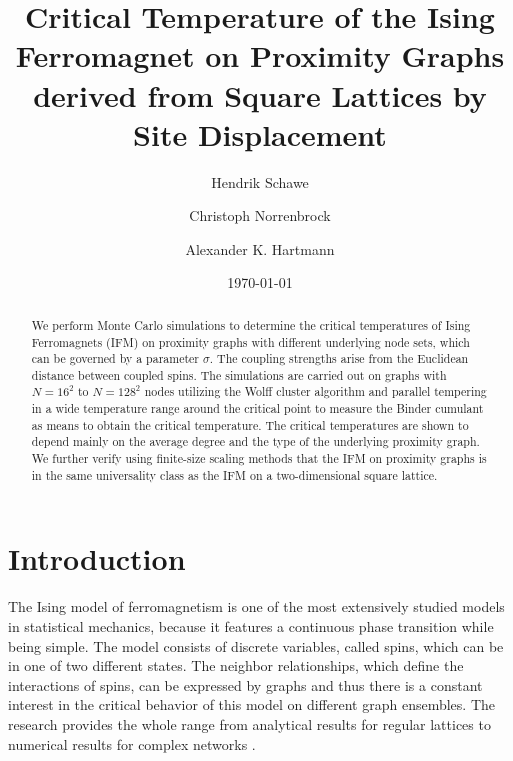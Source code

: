 \documentclass[pre,twocolumn,groupedaddress,showpacs,showkeys,amsmath,amssymb,floatfix]{revtex4-1}
\begin{document}
    \title{Critical Temperature of the Ising Ferromagnet on Proximity Graphs derived from Square Lattices by Site Displacement}
    \author{Hendrik Schawe}
    \author{Christoph Norrenbrock}
    \author{Alexander K. Hartmann}
    \date{\today}

    \begin{abstract}
        We perform Monte Carlo simulations to determine the critical temperatures
        of Ising Ferromagnets (IFM) on proximity graphs with different underlying
        node sets, which can be governed by a parameter $\sigma$.
        The coupling strengths arise from the Euclidean distance
        between coupled spins.
        The simulations are carried out on graphs with \(N=16^{2}\) to \(N=128^{2}\)
        nodes utilizing the Wolff cluster algorithm and parallel tempering in a
        wide temperature range around the critical point to measure
        the Binder cumulant as means to obtain the critical temperature.
        The critical temperatures are shown to depend mainly on the average degree
        and the type of the underlying proximity graph.
        We further verify using finite-size scaling methods that the IFM on proximity
        graphs is in the same universality class as the IFM on a two-dimensional
        square lattice.
    \end{abstract}

    \maketitle

    \section{Introduction}
        The Ising model of ferromagnetism \cite{Ising1925} is one of the
        most extensively studied models in statistical mechanics, because it
        features a continuous phase transition while being simple.
        The model consists of discrete variables, called spins, which can be in
        one of two different states.
        The neighbor relationships, which define the interactions of spins, can be expressed by graphs and
        thus there is a constant interest in the critical behavior of this model
        on different graph ensembles. The research provides the whole range
        from analytical results for regular lattices \cite{Onsager1944,Wannier1945}
        to numerical results for complex networks \cite{Aleksiejuk2002260,Herrero2002SmallWorld,Herrero2004ScaleFree,Herrero2015ScaleFree}.
\end{document}
